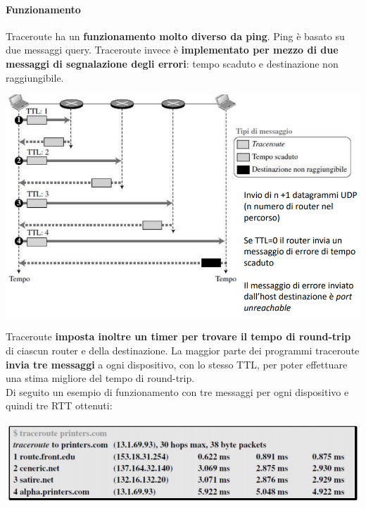 \documentclass[10pt]{article}
\begin{document}
\paragraph{Funzionamento} Traceroute ha un \textbf{funzionamento molto diverso da ping}. Ping è basato su due messaggi query. Traceroute invece è \textbf{implementato per mezzo di due messaggi di segnalazione degli errori}: tempo scaduto e destinazione non raggiungibile.
\begin{center}
\includegraphics[scale=0.7]{traceroute.png}
\end{center}
Traceroute \textbf{imposta inoltre un timer per trovare il tempo di round-trip} di ciascun router e della destinazione. La maggior parte dei programmi traceroute \textbf{invia tre messaggi} a ogni dispositivo, con lo stesso TTL, per poter effettuare una stima migliore del tempo di round-trip.\\
Di seguito un esempio di funzionamento con tre messaggi per ogni dispositivo e quindi tre RTT ottenuti:
\begin{center}
\includegraphics[scale=0.7]{tracerouteesempio.png}
\end{center}
\pagebreak
\end{document}
